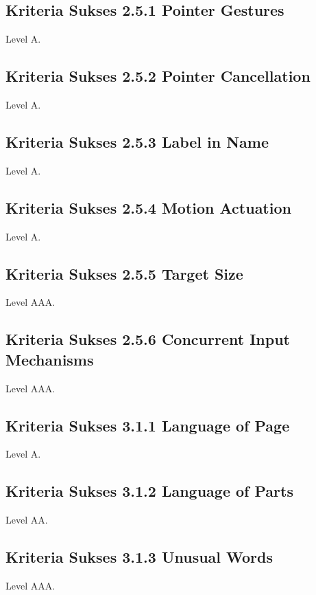 {\subsection{Kriteria Sukses 2.5.1 Pointer Gestures}
\label{sec:kriteria_2.5.1}
Level A.

\subsection{Kriteria Sukses 2.5.2 Pointer Cancellation}
\label{sec:kriteria_2.5.2}
Level A.

\subsection{Kriteria Sukses 2.5.3 Label in Name}
\label{sec:kriteria_2.5.3}
Level A.

\subsection{Kriteria Sukses 2.5.4 Motion Actuation}
\label{sec:kriteria_2.5.4}
Level A.

\subsection{Kriteria Sukses 2.5.5 Target Size}
\label{sec:kriteria_2.5.5}
Level AAA.

\subsection{Kriteria Sukses 2.5.6 Concurrent Input Mechanisms}
\label{sec:kriteria_2.5.6}
Level AAA.

\subsection{Kriteria Sukses 3.1.1 Language of Page}
\label{sec:kriteria_3.1.1}
Level A.

\subsection{Kriteria Sukses 3.1.2 Language of Parts}
\label{sec:kriteria_3.1.2}
Level AA.

\subsection{Kriteria Sukses 3.1.3 Unusual Words}
\label{sec:kriteria_3.1.3}
Level AAA.

}
